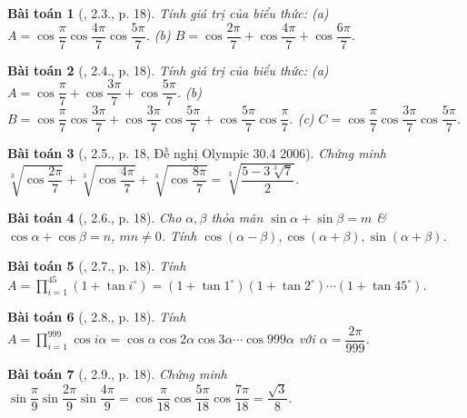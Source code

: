 \documentclass{article}
\newtheorem{baitoan}{Bài toán}
\begin{document}
\begin{baitoan}[\cite{Hung_nang_cao_phat_trien_Toan_11_tap_1}, 2.3., p. 18]
	Tính giá trị của biểu thức: (a) $A = \cos\dfrac{\pi}{7}\cos\dfrac{4\pi}{7}\cos\dfrac{5\pi}{7}$. (b) $B = \cos\dfrac{2\pi}{7} + \cos\dfrac{4\pi}{7} + \cos\dfrac{6\pi}{7}$.
\end{baitoan}

\begin{baitoan}[\cite{Hung_nang_cao_phat_trien_Toan_11_tap_1}, 2.4., p. 18]
	Tính giá trị của biểu thức: (a) $A = \cos\dfrac{\pi}{7} + \cos\dfrac{3\pi}{7} + \cos\dfrac{5\pi}{7}$. (b) $B = \cos\dfrac{\pi}{7}\cos\dfrac{3\pi}{7} + \cos\dfrac{3\pi}{7}\cos\dfrac{5\pi}{7} + \cos\dfrac{5\pi}{7}\cos\dfrac{\pi}{7}$. (c) $C = \cos\dfrac{\pi}{7}\cos\dfrac{3\pi}{7}\cos\dfrac{5\pi}{7}$.
\end{baitoan}

\begin{baitoan}[\cite{Hung_nang_cao_phat_trien_Toan_11_tap_1}, 2.5., p. 18, Đề nghị Olympic 30.4 2006]
	Chứng minh $\sqrt[3]{\cos\dfrac{2\pi}{7}} + \sqrt[3]{\cos\dfrac{4\pi}{7}} + \sqrt[3]{\cos\dfrac{8\pi}{7}} = \sqrt[3]{\dfrac{5 - 3\sqrt[3]{7}}{2}}$.
\end{baitoan}

\begin{baitoan}[\cite{Hung_nang_cao_phat_trien_Toan_11_tap_1}, 2.6., p. 18]
	Cho $\alpha,\beta$ thỏa mãn $\sin\alpha + \sin\beta= m$ \& $\cos\alpha + \cos\beta = n$, $mn\ne0$. Tính $\cos(\alpha - \beta),\cos(\alpha + \beta),\sin(\alpha + \beta)$.
\end{baitoan}

\begin{baitoan}[\cite{Hung_nang_cao_phat_trien_Toan_11_tap_1}, 2.7., p. 18]
	Tính $A = \prod_{i=1}^{45} (1 + \tan i^\circ) = (1 + \tan1^\circ)(1 + \tan2^\circ)\cdots(1 + \tan45^\circ)$.
\end{baitoan}

\begin{baitoan}[\cite{Hung_nang_cao_phat_trien_Toan_11_tap_1}, 2.8., p. 18]
	Tính $A = \prod_{i=1}^{999} \cos i\alpha = \cos\alpha\cos2\alpha\cos3\alpha\cdots\cos999\alpha$ với $\alpha = \dfrac{2\pi}{999}$. 
\end{baitoan}

\begin{baitoan}[\cite{Hung_nang_cao_phat_trien_Toan_11_tap_1}, 2.9., p. 18]
	Chứng minh $\sin\dfrac{\pi}{9}\sin\dfrac{2\pi}{9}\sin\dfrac{4\pi}{9} = \cos\dfrac{\pi}{18}\cos\dfrac{5\pi}{18}\cos\dfrac{7\pi}{18} = \dfrac{\sqrt{3}}{8}$.
\end{baitoan}
\end{document}
